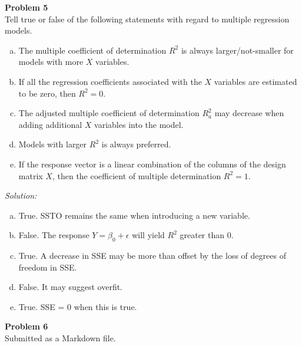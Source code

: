 \documentclass{article}
\newenvironment{problem}[2][Problem]
    { \begin{mdframed}[backgroundcolor=gray!20] \textbf{#1 #2} \\}
    {  \end{mdframed}}
\newenvironment{solution}
    {\textit{Solution:}}
    {}
\begin{document}
\begin{problem}{5}
Tell true or false of the following statements with regard to multiple regression models.
\begin{enumerate}[(a)]
\item The multiple coefficient of determination $R^2$ is always larger/not-smaller for models with more $X$ variables.
\item If all the regression coefficients associated with the $X$ variables are estimated to be zero, then $R^2 = 0.$
\item The adjusted multiple coefficient of determination $R_a^2$ may decrease when adding additional $X$ variables into the model.
\item Models with larger $R^2$ is always preferred.
\item If the response vector is a linear combination of the columns of the design matrix $X$, then the coefficient of multiple determination $R^2 = 1.$
\end{enumerate}
\end{problem}
\begin{solution}
\begin{enumerate}[(a)]
\item True. SSTO remains the same when introducing a new variable. 
\item False. The response $Y = \beta_0 + \epsilon$ will yield $R^2$ greater than 0. 
\item True. A decrease in SSE may be more than offset by the loss of degrees of freedom in SSE. 
\item False. It may suggest overfit. 
\item True. SSE = 0 when this is true. 
\end{enumerate}
\end{solution}


\begin{problem}{6}
Submitted as a  Markdown file. 
\end{problem}
\end{document}
